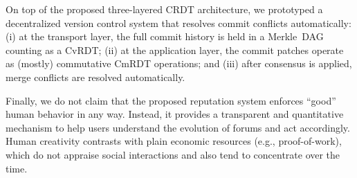 \documentclass[10pt,journal,compsoc]{IEEEtran}
\newcommand{\reps}     {\emph{reps}\xspace}
\begin{document}
On top of the proposed three-layered CRDT architecture, we prototyped a
decentralized version control system that resolves commit conflicts
automatically:
    (i)   at the transport layer, the full commit history is held in a
          Merkle~DAG counting as a CvRDT;
    (ii)  at the application layer, the commit patches operate as (mostly)
          commutative CmRDT operations; and
    (iii) after consensus is applied, merge conflicts are resolved
          automatically.

Finally, we do not claim that the proposed reputation system enforces ``good''
human behavior in any way.
Instead, it provides a transparent and quantitative mechanism to help users
understand the evolution of forums and act accordingly.
Human creativity contrasts with plain economic resources (e.g.,
proof-of-work), which do not appraise social interactions and also tend
to concentrate over the time.
%

\end{document}
